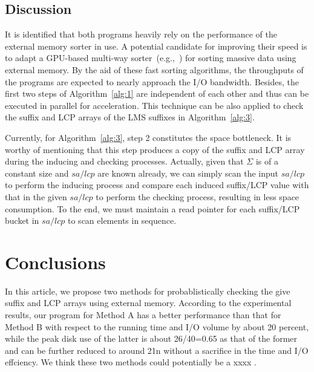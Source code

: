 \documentclass[10pt,journal,compsoc]{IEEEtran}
\begin{document}
	\subsection{Discussion}
	
	It is identified that both programs heavily rely on the performance of the external memory sorter in use. A potential candidate for improving their speed is to adapt a GPU-based multi-way sorter~(e.g.,~\cite{Leischner2010, Davidson2012}) for sorting massive data using external memory. By the aid of these fast sorting algorithms, the throughputs of the programs are expected to nearly approach the I/O bandwidth. Besides, the first two steps of Algorithm~\ref{alg:1} are independent of each other and thus can be executed in parallel for acceleration. This technique can be also applied to check the suffix and LCP arrays of the LMS suffixes in Algorithm~\ref{alg:3}.
	
	Currently, for Algorithm~\ref{alg:3}, step 2 constitutes the space bottleneck. It is worthy of mentioning that this step produces a copy of the suffix and LCP array during the inducing and checking processes. Actually, given that $\Sigma$ is of a constant size and $sa/lcp$ are known already, we can simply scan the input $sa/lcp$ to perform the inducing process and compare each induced suffix/LCP value with that in the given $sa/lcp$ to perform the checking process, resulting in less space consumption. To the end, we must maintain a read pointer for each suffix/LCP bucket in $sa/lcp$ to scan elements in sequence.
	
\section{Conclusions} \label{sec:conclusion}

In this article, we propose two methods for probablistically checking the give suffix and LCP arrays using external memory. According to the experimental results, our program for Method A has a better performance than that for Method B with respect to the running time and I/O volume by about 20 percent, while the peak disk use of the latter is about 26/40=0.65 as that of the former and can be further reduced to around 21n without a sacrifice in the time and I/O effciency. We think these two methods could potentially be a xxxx .	 






	
\end{document}
